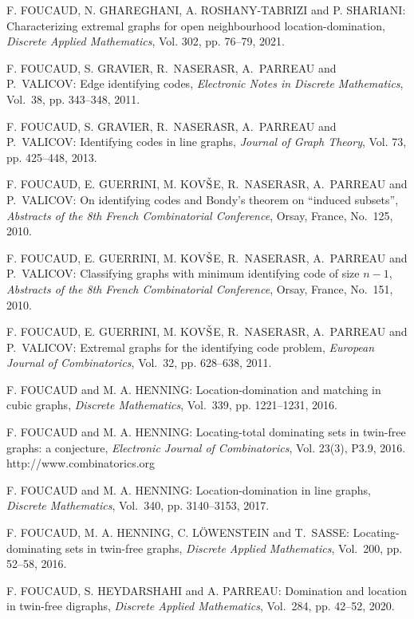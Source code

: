\begin{thebibliography}{999}
F. FOUCAUD, N. GHAREGHANI, A. ROSHANY-TABRIZI and P. SHARIANI: Characterizing extremal graphs for open neighbourhood location-domination, {\it Discrete Applied Mathematics}, Vol. 302, pp. 76--79, 2021.

F. FOUCAUD, S. GRAVIER, R.~NASERASR, A.~PARREAU and P.~VALICOV: Edge identifying codes, {\it Electronic Notes in Discrete Mathematics}, Vol.~38, pp. 343--348, 2011. 

F. FOUCAUD, S. GRAVIER, R.~NASERASR, A.~PARREAU and P.~VALICOV: Identifying codes in line graphs, {\it Journal of Graph Theory}, Vol. 73, pp. 425--448, 2013.

F. FOUCAUD, E. GUERRINI, M. KOV$\check{\rm S}$E, R.~NASERASR, A.~PARREAU and P.~VALICOV: On identifying codes and Bondy's theorem on ``induced subsets'', {\it Abstracts of the 8th French Combinatorial Conference}, Orsay, France, No.~125, 2010.

F. FOUCAUD, E. GUERRINI, M. KOV$\check{\rm S}$E, R.~NASERASR, A.~PARREAU and P.~VALICOV: Classifying graphs with minimum identifying code of size $n-1$, {\it Abstracts of the 8th French Combinatorial Conference}, Orsay, France, No.~151, 2010.

F. FOUCAUD, E. GUERRINI, M. KOV$\check{\rm S}$E, R.~NASERASR, A.~PARREAU and P.~VALICOV: Extremal graphs for the identifying code problem, {\it European Journal of Combinatorics}, Vol.~32, pp. 628--638, 2011.

F. FOUCAUD and M. A. HENNING: Location-domination and matching in cubic graphs, {\it Discrete Mathematics}, Vol.~339, pp. 1221--1231, 2016.

F. FOUCAUD and M. A. HENNING: Locating-total dominating sets in twin-free graphs: a conjecture, {\it Electronic Journal of Combinatorics}, Vol. 23(3), P3.9, 2016.\\
http://www.combinatorics.org

F. FOUCAUD and M. A. HENNING: Location-domination in line graphs, {\it Discrete Mathematics}, Vol.~340, pp. 3140--3153, 2017.
 
 F. FOUCAUD, M. A. HENNING, C. L\"{O}WENSTEIN and T.~SASSE: Locating-dominating sets in twin-free graphs, {\it Discrete Applied Mathematics}, Vol.~200, pp. 52--58, 2016.

F. FOUCAUD, S. HEYDARSHAHI and A. PARREAU: Domination and location in twin-free digraphs, {\it Discrete Applied Mathematics}, Vol.~284, pp. 42--52, 2020.


\end{thebibliography}
